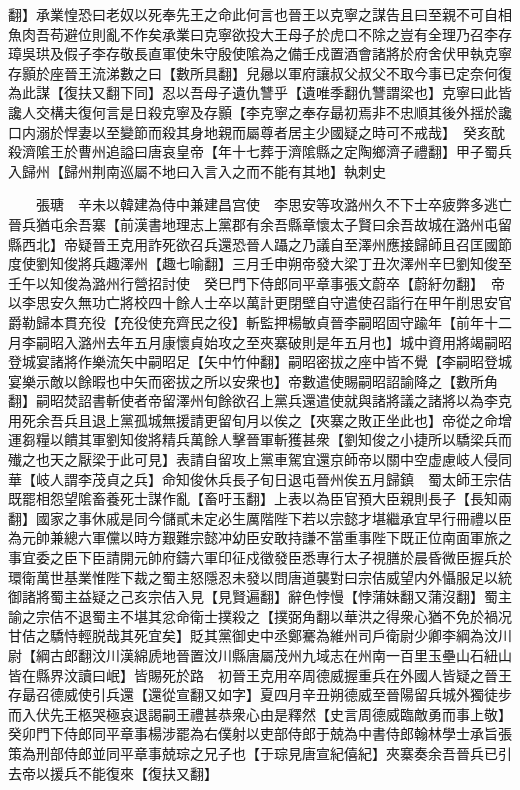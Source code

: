 翻】承業惶恐曰老奴以死奉先王之命此何言也晉王以克寧之謀告且曰至親不可自相魚肉吾苟避位則亂不作矣承業曰克寧欲投大王母子於虎口不除之豈有全理乃召李存璋吳珙及假子李存敬長直軍使朱守殷使隂為之備壬戍置酒會諸將於府舍伏甲執克寧存顥於座晉王流涕數之曰【數所具翻】兒曏以軍府讓叔父叔父不取今事已定奈何復為此謀【復扶又翻下同】忍以吾母子遺仇讐乎【遺唯季翻仇讐謂梁也】克寧曰此皆讒人交構夫復何言是日殺克寧及存顥【李克寧之奉存朂初焉非不忠順其後外揺於讒口内溺於悍妻以至變節而殺其身地親而屬尊者居主少國疑之時可不戒哉】　癸亥酖殺濟隂王於曹州追謚曰唐哀皇帝【年十七葬于濟隂縣之定陶鄉濟子禮翻】甲子蜀兵入歸州【歸州荆南巡屬不地曰入言入之而不能有其地】執刺史

　　張瑭　辛未以韓建為侍中兼建昌宫使　李思安等攻潞州久不下士卒疲弊多逃亡晉兵猶屯余吾寨【前漢書地理志上黨郡有余吾縣章懷太子賢曰余吾故城在潞州屯留縣西北】帝疑晉王克用詐死欲召兵還恐晉人躡之乃議自至澤州應接歸師且召匡國節度使劉知俊將兵趣澤州【趣七喻翻】三月壬申朔帝發大梁丁丑次澤州辛巳劉知俊至壬午以知俊為潞州行營招討使　癸巳門下侍郎同平章事張文蔚卒【蔚紆勿翻】　帝以李思安久無功亡將校四十餘人士卒以萬計更閉壁自守遣使召詣行在甲午削思安官爵勒歸本貫充役【充役使充齊民之役】斬監押楊敏貞晉李嗣昭固守踰年【前年十二月李嗣昭入潞州去年五月康懷貞始攻之至夾寨破則是年五月也】城中資用將竭嗣昭登城宴諸將作樂流矢中嗣昭足【矢中竹仲翻】嗣昭密拔之座中皆不覺【李嗣昭登城宴樂示敵以餘暇也中矢而密拔之所以安衆也】帝數遣使賜嗣昭詔諭降之【數所角翻】嗣昭焚詔書斬使者帝留澤州旬餘欲召上黨兵還遣使就與諸將議之諸將以為李克用死余吾兵且退上黨孤城無援請更留旬月以俟之【夾寨之敗正坐此也】帝從之命增運芻糧以饋其軍劉知俊將精兵萬餘人擊晉軍斬獲甚衆【劉知俊之小捷所以驕梁兵而殱之也天之厭梁于此可見】表請自留攻上黨車駕宜還京師帝以關中空虚慮岐人侵同華【岐人謂李茂貞之兵】命知俊休兵長子旬日退屯晉州俟五月歸鎮　蜀太師王宗佶既罷相怨望隂畜養死士謀作亂【畜吁玉翻】上表以為臣官預大臣親則長子【長知兩翻】國家之事休戚是同今儲貳未定必生厲階陛下若以宗懿才堪繼承宜早行冊禮以臣為元帥兼總六軍儻以時方艱難宗懿冲幼臣安敢持謙不當重事陛下既正位南面軍旅之事宜委之臣下臣請開元帥府鑄六軍印征戍徵發臣悉專行太子視膳於晨昏微臣握兵於環衛萬世基業惟陛下裁之蜀主怒隱忍未發以問唐道襲對曰宗佶威望内外懾服足以統御諸將蜀主益疑之己亥宗佶入見【見賢遍翻】辭色悖慢【悖蒲妹翻又蒲沒翻】蜀主諭之宗佶不退蜀主不堪其忿命衛士撲殺之【撲弼角翻以華洪之得衆心猶不免於禍况甘佶之驕恃輕脱哉其死宜矣】貶其黨御史中丞鄭騫為維州司戶衛尉少卿李綱為汶川尉【綱古郎翻汶川漢綿虒地晉置汶川縣唐屬茂州九域志在州南一百里玉壘山石紐山皆在縣界汶讀曰岷】皆賜死於路　初晉王克用卒周德威握重兵在外國人皆疑之晉王存朂召德威使引兵還【還從宣翻又如字】夏四月辛丑朔德威至晉陽留兵城外獨徒步而入伏先王柩哭極哀退謁嗣王禮甚恭衆心由是釋然【史言周德威臨敵勇而事上敬】　癸卯門下侍郎同平章事楊涉罷為右僕射以吏部侍郎于兢為中書侍郎翰林學士承旨張策為刑部侍郎並同平章事兢琮之兄子也【于琮見唐宣紀僖紀】夾寨奏余吾晉兵已引去帝以援兵不能復來【復扶又翻】

